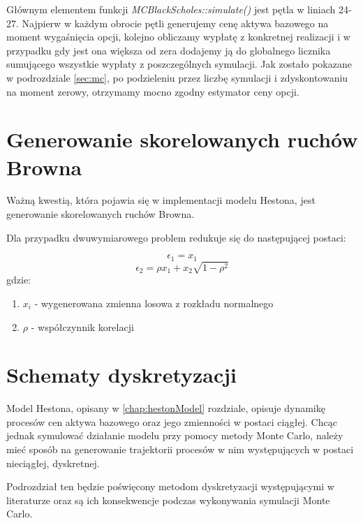 \documentclass{pracamgr}
\begin{document}
{Głównym elementem funkcji \textit{MCBlackScholes::simulate()} jest pętla w liniach 24-27. Najpierw w każdym 
obrocie pętli generujemy cenę aktywa bazowego na moment wygaśnięcia opcji, kolejno obliczamy wypłatę z konkretnej
realizacji i w przypadku gdy jest ona większa od zera dodajemy ją do globalnego licznika sumującego wszystkie 
wypłaty z poszczególnych symulacji. Jak zostało pokazane w podrozdziale \ref{sec:mc}, po podzieleniu przez liczbę symulacji i zdyskontowaniu na moment zerowy, otrzymamy mocno zgodny estymator ceny opcji.



\section{Generowanie skorelowanych ruchów Browna}

Ważną kwestią, która pojawia się w implementacji modelu Hestona, jest generowanie skorelowanych 
ruchów Browna.

Dla przypadku dwuwymiarowego problem redukuje się do 
następującej postaci:

\begin{equation}
  \epsilon_1 = x_1
\end{equation}
\begin{equation}
  \epsilon_2 = \rho x_1 + x_2 \sqrt{1-\rho^2}
\end{equation}
gdzie:
\begin{enumerate}
  \item $x_i$ - wygenerowana zmienna losowa z rozkładu normalnego
  \item $\rho$  - współczynnik korelacji
\end{enumerate}




\section{Schematy dyskretyzacji}


Model Hestona, opisany w \ref{chap:hestonModel} rozdziale, opisuje dynamikę procesów cen aktywa 
bazowego oraz jego zmienności w postaci ciągłej.
Chcąc jednak symulować działanie modelu przy pomocy metody Monte Carlo, należy mieć sposób na generowanie trajektorii procesów w nim występujących w postaci nieciągłej, dyskretnej. 

Podrozdział ten będzie poświęcony metodom dyskretyzacji występującymi w literaturze oraz są ich konsekwencje podczas wykonywania symulacji Monte Carlo.


}
\end{document}

